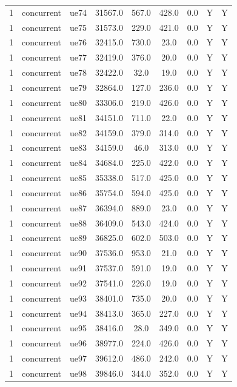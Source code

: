 \begin{table}[ht]
\begin{tabular}{|c|c|c|c|c|c|c|c|c|}
1 & concurrent & ue74 & 31567.0 & 567.0 & 428.0 & 0.0 & Y & Y \\
1 & concurrent & ue75 & 31573.0 & 229.0 & 421.0 & 0.0 & Y & Y \\
1 & concurrent & ue76 & 32415.0 & 730.0 & 23.0 & 0.0 & Y & Y \\
1 & concurrent & ue77 & 32419.0 & 376.0 & 20.0 & 0.0 & Y & Y \\
1 & concurrent & ue78 & 32422.0 & 32.0 & 19.0 & 0.0 & Y & Y \\
1 & concurrent & ue79 & 32864.0 & 127.0 & 236.0 & 0.0 & Y & Y \\
1 & concurrent & ue80 & 33306.0 & 219.0 & 426.0 & 0.0 & Y & Y \\
1 & concurrent & ue81 & 34151.0 & 711.0 & 22.0 & 0.0 & Y & Y \\
1 & concurrent & ue82 & 34159.0 & 379.0 & 314.0 & 0.0 & Y & Y \\
1 & concurrent & ue83 & 34159.0 & 46.0 & 313.0 & 0.0 & Y & Y \\
1 & concurrent & ue84 & 34684.0 & 225.0 & 422.0 & 0.0 & Y & Y \\
1 & concurrent & ue85 & 35338.0 & 517.0 & 425.0 & 0.0 & Y & Y \\
1 & concurrent & ue86 & 35754.0 & 594.0 & 425.0 & 0.0 & Y & Y \\
1 & concurrent & ue87 & 36394.0 & 889.0 & 23.0 & 0.0 & Y & Y \\
1 & concurrent & ue88 & 36409.0 & 543.0 & 424.0 & 0.0 & Y & Y \\
1 & concurrent & ue89 & 36825.0 & 602.0 & 503.0 & 0.0 & Y & Y \\
1 & concurrent & ue90 & 37536.0 & 953.0 & 21.0 & 0.0 & Y & Y \\
1 & concurrent & ue91 & 37537.0 & 591.0 & 19.0 & 0.0 & Y & Y \\
1 & concurrent & ue92 & 37541.0 & 226.0 & 19.0 & 0.0 & Y & Y \\
1 & concurrent & ue93 & 38401.0 & 735.0 & 20.0 & 0.0 & Y & Y \\
1 & concurrent & ue94 & 38413.0 & 365.0 & 227.0 & 0.0 & Y & Y \\
1 & concurrent & ue95 & 38416.0 & 28.0 & 349.0 & 0.0 & Y & Y \\
1 & concurrent & ue96 & 38977.0 & 224.0 & 426.0 & 0.0 & Y & Y \\
1 & concurrent & ue97 & 39612.0 & 486.0 & 242.0 & 0.0 & Y & Y \\
1 & concurrent & ue98 & 39846.0 & 344.0 & 352.0 & 0.0 & Y & Y \\

\end{tabular}
\end{table}
